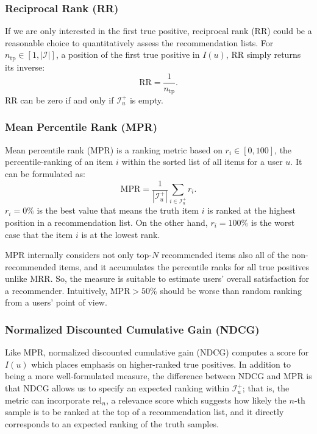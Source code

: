 \subsubsection{Reciprocal Rank (RR)}

If we are only interested in the first true positive, reciprocal rank (RR) could be a reasonable choice to quantitatively assess the recommendation lists. For $n_{\mathrm{tp}} \in \left[ 1, |\mathcal{I}| \right]$, a position of the first true positive in $I(u)$, RR simply returns its inverse:
\begin{equation*}
  \mathrm{RR} = \frac{1}{n_{\mathrm{tp}}}.
\end{equation*}
RR can be zero if and only if $\mathcal{I}^+_u$ is empty.

\subsubsection{Mean Percentile Rank (MPR)}
Mean percentile rank (MPR) is a ranking metric based on $r_{i} \in [0, 100]$, the percentile-ranking of an item $i$ within the sorted list of all items for a user $u$. It can be formulated as:
\begin{equation*}
\mathrm{MPR} = \frac{1}{|\mathcal{I}^+_u|} \sum_{i \in \mathcal{I}^+_u} r_{i}.
\end{equation*}
$r_{i} = 0\%$ is the best value that means the truth item $i$ is ranked at the highest position in a recommendation list. On the other hand, $r_{i} = 100\%$ is the worst case that the item $i$ is at the lowest rank.

MPR internally considers not only top-$N$ recommended items also all of the non-recommended items, and it accumulates the percentile ranks for all true positives unlike MRR. So, the measure is suitable to estimate users' overall satisfaction for a recommender. Intuitively, $\mathrm{MPR} > 50\%$ should be worse than random ranking from a users' point of view.

\subsubsection{Normalized Discounted Cumulative Gain (NDCG)}

Like MPR, normalized discounted cumulative gain (NDCG) computes a score for $I(u)$ which places emphasis on higher-ranked true positives. In addition to being a more well-formulated measure, the difference between NDCG and MPR is that NDCG allows us to specify an expected ranking within $\mathcal{I}^+_u$; that is, the metric can incorporate $\mathrm{rel}_n$, a relevance score which suggests how likely the $n$-th sample is to be ranked at the top of a recommendation list, and it directly corresponds to an expected ranking of the truth samples.


